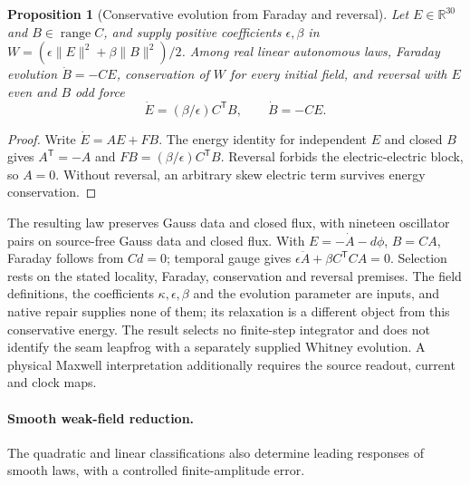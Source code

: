 \documentclass[11pt]{article}
\newtheorem{proposition}[theorem]{Proposition}
\theoremstyle{remark}
\theoremstyle{plain}
\begin{document}
\begin{proposition}[Conservative evolution from Faraday and reversal]
Let $E\in\mathbb R^{30}$ and $B\in\operatorname{range}C$, and supply
positive coefficients $\epsilon,\beta$ in
$W=(\epsilon\|E\|^2+\beta\|B\|^2)/2$.
Among real linear autonomous laws, Faraday evolution $\dot B=-CE$,
conservation of $W$ for every initial field, and reversal with $E$ even
and $B$ odd force
\[
 \dot E=(\beta/\epsilon)C^{\mathsf T}B,\qquad \dot B=-CE.
\]
\end{proposition}
\begin{proof}
Write $\dot E=AE+FB$. The energy identity for independent $E$ and closed
$B$ gives $A^{\mathsf T}=-A$ and
$FB=(\beta/\epsilon)C^{\mathsf T}B$. Reversal forbids the
electric-electric block, so $A=0$. Without reversal, an arbitrary skew
electric term survives energy conservation.
\end{proof}

The resulting law preserves Gauss data and closed flux, with nineteen
oscillator pairs on source-free Gauss data and closed flux. With
$E=-\dot A-d\phi$, $B=CA$, Faraday follows from $Cd=0$; temporal gauge
gives $\epsilon\ddot A+\beta C^{\mathsf T}CA=0$. Selection rests on the
stated locality, Faraday, conservation and reversal premises. The field
definitions, the coefficients $\kappa,\epsilon,\beta$ and the evolution
parameter are inputs, and native repair supplies none of them; its relaxation
is a different object from this conservative energy. The result selects no
finite-step integrator and does not identify the seam leapfrog with a
separately supplied Whitney evolution. A physical Maxwell interpretation
additionally requires the source readout, current and clock maps.

\paragraph{Smooth weak-field reduction.}
The quadratic and linear classifications also determine leading responses
of smooth laws, with a controlled finite-amplitude error.
\end{document}
